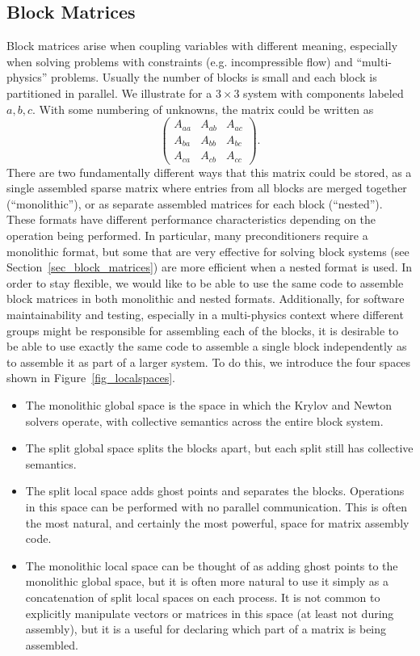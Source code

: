 \subsection{Block Matrices}
\label{sec_matnest}
Block matrices arise when coupling variables with different meaning, especially when solving problems with constraints (e.g. incompressible flow) and ``multi-physics'' problems.
Usually the number of blocks is small and each block is partitioned in parallel.
We illustrate for a $3\times 3$ system with components labeled $a,b,c$.
With some numbering of unknowns, the matrix could be written as
\[
\left( \begin{array}{ccc}
    A_{aa} & A_{ab} & A_{ac} \\
    A_{ba} & A_{bb} & A_{bc} \\
    A_{ca} & A_{cb} & A_{cc}
  \end{array} \right) .
\]
There are two fundamentally different ways that this matrix could be stored, as a single assembled sparse matrix where entries from all blocks are merged together (``monolithic''), or as separate assembled matrices for each block (``nested'').
These formats have different performance characteristics depending on the operation being performed.
In particular, many preconditioners require a monolithic format, but some that are very effective for solving block systems (see Section~\ref{sec_block_matrices}) are more efficient when a nested format is used.
In order to stay flexible, we would like to be able to use the same code to assemble block matrices in both monolithic and nested formats.
Additionally, for software maintainability and testing, especially in a multi-physics context where different groups might be responsible for assembling each of the blocks, it is desirable to be able to use exactly the same code to assemble a single block independently as to assemble it as part of a larger system.
To do this, we introduce the four spaces shown in Figure~\ref{fig_localspaces}.
\begin{itemize}
\item The monolithic global space is the space in which the Krylov and Newton solvers operate, with collective semantics across the entire block system.
\item The split global space splits the blocks apart, but each split still has collective semantics.
\item The split local space adds ghost points and separates the blocks.
  Operations in this space can be performed with no parallel communication.
  This is often the most natural, and certainly the most powerful, space for matrix assembly code.
\item The monolithic local space can be thought of as adding ghost points to the monolithic global space, but it is often more natural to use it simply as a concatenation of split local spaces on each process.
  It is not common to explicitly manipulate vectors or matrices in this space (at least not during assembly), but it is a useful for declaring which part of a matrix is being assembled.
\end{itemize}

